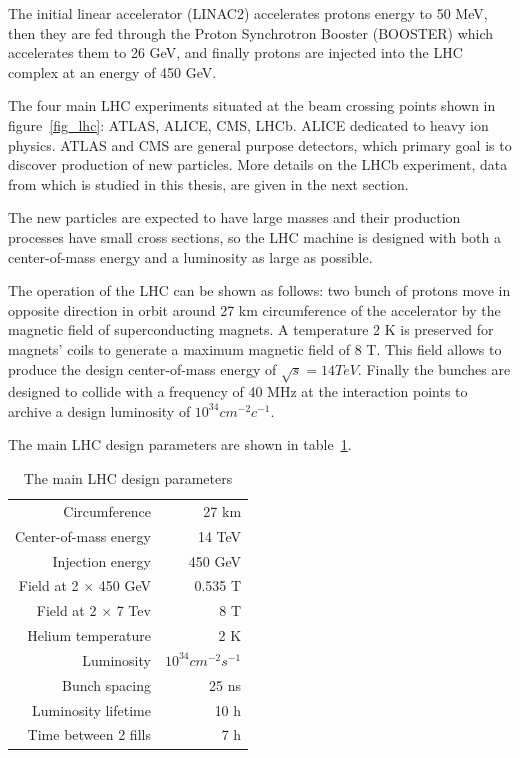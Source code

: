 The initial linear accelerator (LINAC2) accelerates protons energy to 50 MeV,
then they are fed through the Proton Synchrotron Booster (BOOSTER) which
accelerates them to 26 GeV, and finally protons are injected  into the LHC
complex at an energy of 450 GeV.

The four main LHC experiments situated at the beam crossing points shown in
figure~\ref{fig_lhc}: ATLAS, ALICE, CMS, LHCb. ALICE dedicated to heavy ion physics.
ATLAS and CMS are general purpose detectors, which primary goal is to discover
production of new particles. More details on the  LHCb experiment, data from
 which is studied in this thesis, are given in the next section.

The new particles are expected to have large masses and their production
processes have small cross sections, so the LHC machine is designed with both
a center-of-mass energy and a luminosity as large as possible.

The operation of the LHC can be shown as follows: two bunch of protons move in
opposite direction in orbit around 27 km circumference of the accelerator by
the magnetic field of superconducting magnets. A temperature 2 K is preserved
for magnets' coils to generate a maximum magnetic field of 8 T.  This field
allows to produce the design center-of-mass energy of $\sqrt{s}=14 TeV$.
Finally the bunches are designed to collide with a frequency of 40 MHz at the
interaction points to archive a design luminosity of $10^{34}cm^{-2}c^{-1}$.

The main LHC design parameters are shown in table~\ref{tab_lhc}.

\begin{table}
    \centering
    \begin{tabular}{||r|r||}
      \hline
        Circumference  &  27 km\\
        Center-of-mass energy &  14 TeV\\
        Injection energy  &  450 GeV\\
        Field at 2 $\times$ 450 GeV  &  0.535 T\\
        Field at 2 $\times$ 7 Tev & 8 T\\
        Helium temperature & 2 K\\
        Luminosity & $10^{34}cm^{-2}s^{-1}$\\
        Bunch spacing  & 25 ns\\
        Luminosity lifetime & 10 h\\
        Time between 2 fills  &  7 h\\
      \hline
    \end{tabular}
    \caption{The main LHC design parameters}
\label{tab_lhc}
\end{table}

